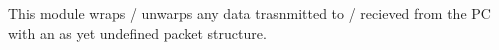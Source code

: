 This module wraps / unwarps any data trasnmitted to / recieved from the PC with an as yet undefined packet structure. 